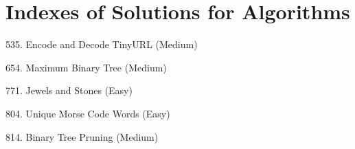 \tocless\section{Indexes of Solutions for Algorithms}
\label{sec:algo_ind}

\begin{flushleft}
535. Encode and Decode TinyURL (Medium)\hfill\pageref{algo:535}

654. Maximum Binary Tree (Medium)\hfill\pageref{algo:654}

771. Jewels and Stones (Easy)\hfill\pageref{algo:771}

804. Unique Morse Code Words (Easy)\hfill\pageref{algo:804}

814. Binary Tree Pruning (Medium)\hfill\pageref{algo:814}
\end{flushleft}

\newpage
